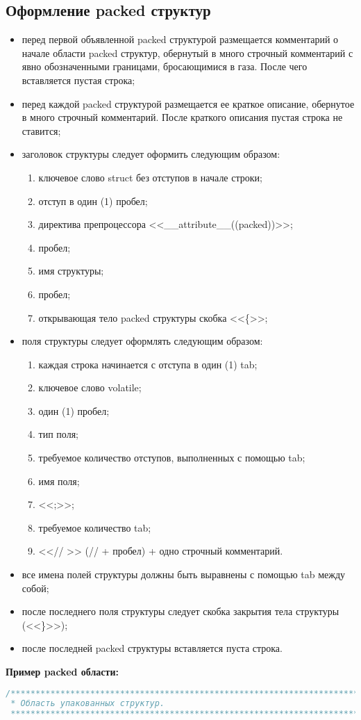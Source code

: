 \subsection{Оформление packed структур}
\begin{itemize}
	\item перед первой объявленной packed структурой размещается комментарий о начале области packed структур, обернутый в много строчный комментарий с явно обозначенными границами, бросающимися в газа. После чего вставляется пустая строка;
	\item перед каждой packed структурой размещается ее краткое описание, обернутое в много строчный комментарий. После краткого описания пустая строка не ставится;
	\item заголовок структуры следует оформить следующим образом:
	\begin{enumerate}
		\item ключевое слово struct без отступов в начале строки;
		\item отступ в один (1) пробел;
		\item директива препроцессора <<\_\_attribute\_\_((packed))>>;
		\item пробел;
		\item имя структуры;
		\item пробел;
		\item открывающая тело packed структуры скобка <<\{>>;
	\end{enumerate}
	\item поля структуры следует оформлять следующим образом:
	\begin{enumerate}
		\item каждая строка начинается с отступа в один (1) tab;
		\item ключевое слово volatile;
		\item один (1) пробел;
		\item тип поля;
		\item требуемое количество отступов, выполненных с помощью tab;
		\item имя поля;
		\item <<;>>;
		\item требуемое количество tab;
		\item <<// >> (// + пробел) + одно строчный комментарий.
	\end{enumerate}
	\item все имена полей структуры должны быть выравнены с помощью tab между собой;
	\item после последнего поля структуры следует скобка закрытия тела структуры (<<\}>>);
	\item после последней packed структуры вставляется пуста строка.
\end{itemize}\textbf{Пример packed области:}\begin{lstlisting}[language=C++, frame=tlBR, basicstyle=\fontsize{10}{10}\ttfamily]
/**********************************************************************
 * Область упакованных структур.
 **********************************************************************/


\end{lstlisting}
